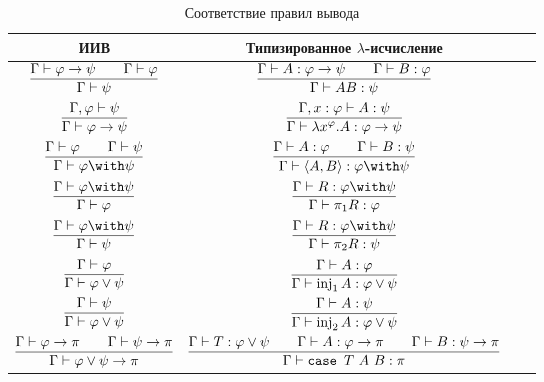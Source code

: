 \begin{table}[hp]
\centering
\begin{tabular}{Sc@{\hspace{1.5cm}} Sc} \toprule
    ИИВ & Типизированное $\lambda$-исчисление \\ \midrule

    $\infer{\Gamma \vdash \psi}{\Gamma \vdash \varphi \to \psi && \Gamma \vdash \varphi}$ &
    $\infer{\Gamma \vdash AB : \psi}{\Gamma \vdash A : \varphi \to \psi && \Gamma \vdash B : \varphi}$ \\ \addlinespace

    $\infer{\Gamma \vdash \varphi \to \psi}{\Gamma, \varphi \vdash \psi}$ &
    $\infer{\Gamma \vdash \lambda x^\varphi . A : \varphi \to \psi}{\Gamma, x : \varphi \vdash A : \psi}$ \\ \midrule

    $\infer{\Gamma \vdash \varphi \with \psi}{\Gamma \vdash \varphi && \Gamma \vdash \psi}$ &
    $\infer{\Gamma \vdash \left<A,B\right> : \varphi \with \psi}{\Gamma \vdash A : \varphi && \Gamma \vdash B : \psi}$ \\ \addlinespace

    $\infer{\Gamma \vdash \varphi}{\Gamma \vdash \varphi \with \psi}$ &
    $\infer{\Gamma \vdash \pi_1 R : \varphi}{\Gamma \vdash R : \varphi \with \psi}$ \\ \addlinespace

    $\infer{\Gamma \vdash \psi}{\Gamma \vdash \varphi \with \psi}$ &
    $\infer{\Gamma \vdash \pi_2 R : \psi}{\Gamma \vdash R : \varphi \with \psi}$ \\ \midrule

    $\infer{\Gamma \vdash \varphi \vee \psi}{\Gamma \vdash \varphi}$ &
    $\infer{\Gamma \vdash \inj_1 A : \varphi \vee \psi}{\Gamma \vdash A : \varphi}$ \\ \addlinespace

    $\infer{\Gamma \vdash \varphi \vee \psi}{\Gamma \vdash \psi}$ &
    $\infer{\Gamma \vdash \inj_2 A : \varphi \vee \psi}{\Gamma \vdash A : \psi}$ \\ \addlinespace

    $\infer{\Gamma \vdash \varphi \vee \psi \to \pi}
        {\Gamma \vdash \varphi \to \pi && \Gamma \vdash \psi \to \pi}$ &
    $\infer{\Gamma \vdash \case{T}{A}{B} : \pi}{\Gamma \vdash T : \varphi \vee \psi &&
        \Gamma \vdash A : \varphi \to \pi && \Gamma \vdash B : \psi \to \pi}$ \\ \bottomrule
\end{tabular}
\caption{Соответствие правил вывода}
\label{correspondence-table}
\end{table}


